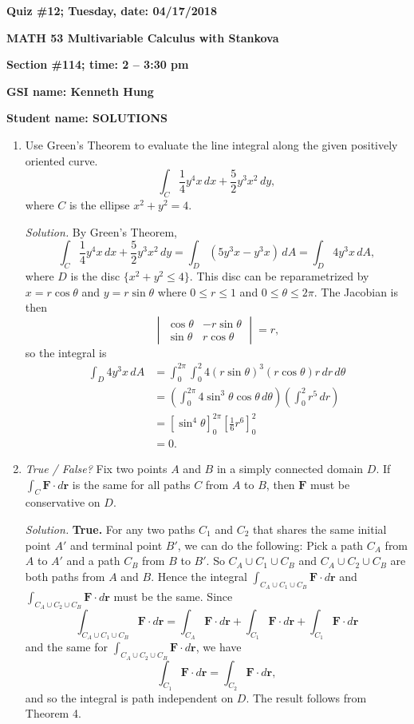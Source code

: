 \documentclass{article}
\newcommand{\rr}{\mathbf{r}}
\begin{document}
{\bf Quiz \#12; Tuesday, date: 04/17/2018}

{\bf MATH 53 Multivariable Calculus with Stankova}

{\bf Section \#114; time: 2 -- 3:30 pm}

{\bf GSI name: Kenneth Hung}

{\bf Student name: SOLUTIONS}

\vspace*{0.25in}

\begin{enumerate}
\item Use Green's Theorem to evaluate the line integral along the given positively oriented curve.
\[
\int_C \frac{1}{4} y^4 x \,dx + \frac{5}{2}y^3 x^2 \,dy,
\]
where $C$ is the ellipse $x^2 + y^2 = 4$.

{\em Solution.} By Green's Theorem,
\[
\int_C \frac{1}{4} y^4 x \,dx + \frac{5}{2}y^3 x^2 \,dy = \int_D \left(5y^3 x - y^3 x\right) \,dA = \int_D 4y^3 x \,dA,
\]
where $D$ is the disc $\{x^2 + y^2 \le 4\}$. This disc can be reparametrized by $x = r \cos \theta$ and $y = r \sin \theta$ where $0 \le r \le 1$ and $0 \le \theta \le 2\pi$. The Jacobian is then
\[
\begin{vmatrix}
\cos \theta & -r \sin \theta \\
\sin \theta & r \cos \theta
\end{vmatrix} = r,
\]
so the integral is
\begin{align*}
\int_D 4y^3x \,dA & = \int_0^{2\pi} \int_0^2 4 (r \sin \theta)^3 (r \cos \theta) r \,dr \,d\theta \\
& = \left(\int_0^{2\pi} 4 \sin^3 \theta \cos \theta \,d\theta\right) \left(\int_0^2 r^5 \,dr\right) \\
& = \left[\sin^4 \theta\right]_0^{2\pi} \left[\frac{1}{6} r^6\right]_0^2 \\
& = 0.
\end{align*}

\item {\em True / False?} Fix two points $A$ and $B$ in a simply connected domain $D$. If $\int_C \mathbf{F} \cdot d\rr$ is the same for all paths $C$ from $A$ to $B$, then $\mathbf{F}$ must be conservative on $D$.

{\em Solution.} {\bf True.} For any two paths $C_1$ and $C_2$ that shares the same initial point $A'$ and terminal point $B'$, we can do the following: Pick a path $C_A$ from $A$ to $A'$ and a path $C_B$ from $B$ to $B'$. So $C_A \cup C_1 \cup C_B$ and $C_A \cup C_2 \cup C_B$ are both paths from $A$ and $B$. Hence the integral $\int_{C_A \cup C_1 \cup C_B} \mathbf{F} \cdot d\rr$ and $\int_{C_A \cup C_2 \cup C_B} \mathbf{F} \cdot d\rr$ must be the same. Since
\[
\int_{C_A \cup C_1 \cup C_B} \mathbf{F} \cdot d\rr = \int_{C_A} \mathbf{F} \cdot d\rr + \int_{C_1} \mathbf{F} \cdot d\rr + \int_{C_1} \mathbf{F} \cdot d\rr
\]
and the same for $\int_{C_A \cup C_2 \cup C_B} \mathbf{F} \cdot d\rr$, we have
\[
\int_{C_1} \mathbf{F} \cdot d\rr = \int_{C_2} \mathbf{F} \cdot d\rr,
\]
and so the integral is path independent on $D$. The result follows from Theorem 4.


\end{enumerate}
\end{document}
